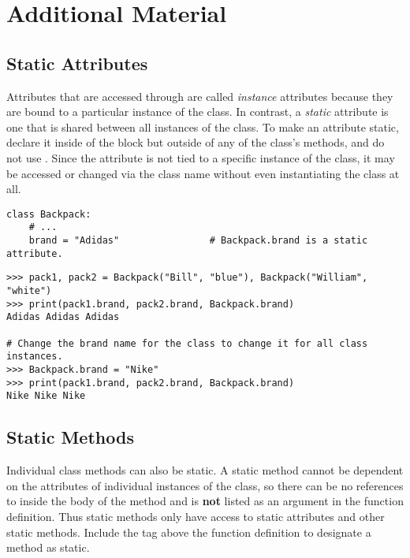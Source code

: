 \newpage

\section*{Additional Material} %

\subsection*{Static Attributes} %

Attributes that are accessed through  are called \emph{instance} attributes because they are bound to a particular instance of the class.
In contrast, a \emph{static} attribute is one that is shared between all instances of the class.
To make an attribute static, declare it inside of the  block but outside of any of the class's methods, and do not use .
Since the attribute is not tied to a specific instance of the class, it may be accessed or changed via the class name without even instantiating the class at all.

\begin{lstlisting}
class Backpack:
    # ...
    brand = "Adidas"                # Backpack.brand is a static attribute.
\end{lstlisting}

\begin{lstlisting}
>>> pack1, pack2 = Backpack("Bill", "blue"), Backpack("William", "white")
>>> print(pack1.brand, pack2.brand, Backpack.brand)
Adidas Adidas Adidas

# Change the brand name for the class to change it for all class instances.
>>> Backpack.brand = "Nike"
>>> print(pack1.brand, pack2.brand, Backpack.brand)
Nike Nike Nike
\end{lstlisting}

\subsection*{Static Methods} %

Individual class methods can also be static.
A static method cannot be dependent on the attributes of individual instances of the class, so there can be no references to  inside the body of the method and  is \textbf{not} listed as an argument in the function definition.
Thus static methods only have access to static attributes and other static methods.
Include the tag  above the function definition to designate a method as static.


